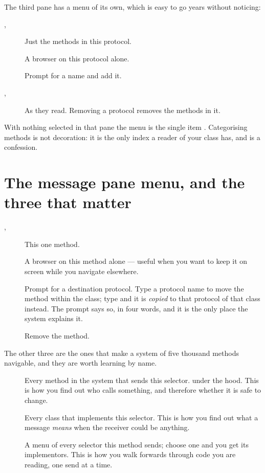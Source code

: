 The third pane has a menu of its own, which is easy to go years without
noticing:

\begin{description}
\item[, ] Just the methods in this protocol.
\item[] A browser on this protocol alone.
\item[] Prompt for a name and add it.
\item[, ] As they read. Removing a protocol removes
  the methods in it.
\end{description}

With nothing selected in that pane the menu is the single item
. Categorising methods is not decoration: it is the only
index a reader of your class has, and  is a
confession.

\section{The message pane menu, and the three that matter}

\begin{description}
\item[, ] This one method.
\item[] A browser on this method alone --- useful when you want to
  keep it on screen while you navigate elsewhere.
\item[] Prompt for a destination protocol. Type a protocol name to
  move the method within the class; type  and it is
  \emph{copied} to that protocol of that class instead. The prompt says so, in
  four words, and it is the only place the system explains it.
\item[] Remove the method.
\end{description}

The other three are the ones that make a system of five thousand methods
navigable, and they are worth learning by name.

\begin{description}
\item[] Every method in the system that sends this selector.
   under the hood. This is how you find out
  who calls something, and therefore whether it is safe to change.
\item[] Every class that implements this selector.
  This is how you find out what a message \emph{means} when the receiver could
  be anything.
\item[] A menu of every selector this method sends; choose one
  and you get its implementors. This is how you walk forwards through code you
  are reading, one send at a time.
\end{description}

